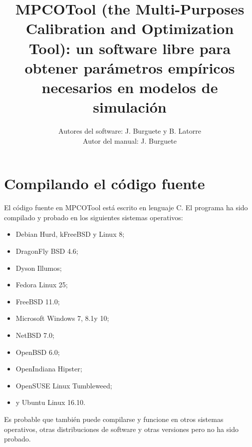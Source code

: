 \documentclass[a4paper]{report}
\begin{document}
\title{MPCOTool (the Multi-Purposes Calibration and Optimization Tool): un
software libre para obtener parámetros empíricos necesarios en modelos de
simulación}

\author{Autores del software: J. Burguete y B. Latorre\\
Autor del manual: J. Burguete}

\maketitle

\tableofcontents

\chapter{Compilando el código fuente}

El código fuente en MPCOTool está escrito en lenguaje C. El programa ha sido
compilado y probado en los siguientes sistemas operativos:
\begin{itemize}
\item Debian Hurd, kFreeBSD y Linux 8;
\item DragonFly BSD 4.6;
\item Dyson Illumos;
\item Fedora Linux 25;
\item FreeBSD 11.0;
\item Microsoft Windows 7\footnotemark[1], 8.1\footnotemark[1] y
	10\footnotemark[1];
\item NetBSD 7.0;
\item OpenBSD 6.0;
\item OpenIndiana Hipster;
\item OpenSUSE Linux Tumbleweed;
\item y Ubuntu Linux 16.10.
\end{itemize}
Es probable que también puede compilarse y funcione en otros sistemas
operativos, otras distribuciones de software y otras versiones pero no ha sido
probado.
\end{document}
